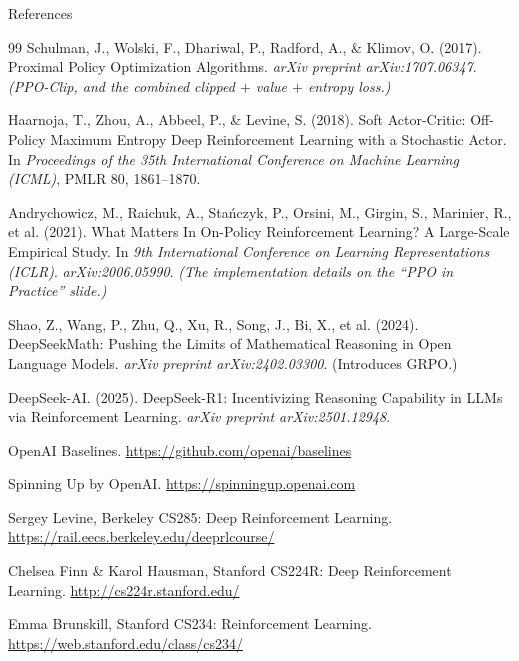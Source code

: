\begin{frame}[allowframebreaks]{References}
\begin{thebibliography}{99}
Schulman, J., Wolski, F., Dhariwal, P., Radford, A., \& Klimov, O. (2017).
\newblock Proximal Policy Optimization Algorithms.
\newblock \emph{arXiv preprint arXiv:1707.06347}.
\newblock \textit{(PPO-Clip, and the combined clipped $+$ value $+$ entropy loss.)}

Haarnoja, T., Zhou, A., Abbeel, P., \& Levine, S. (2018).
\newblock Soft Actor-Critic: Off-Policy Maximum Entropy Deep Reinforcement Learning with a Stochastic Actor.
\newblock In \emph{Proceedings of the 35th International Conference on Machine Learning (ICML)}, PMLR 80, 1861--1870.

Andrychowicz, M., Raichuk, A., Sta\'nczyk, P., Orsini, M., Girgin, S., Marinier, R., et al. (2021).
\newblock What Matters In On-Policy Reinforcement Learning? A Large-Scale Empirical Study.
\newblock In \emph{9th International Conference on Learning Representations (ICLR)}. \emph{arXiv:2006.05990}.
\newblock \textit{(The implementation details on the ``PPO in Practice'' slide.)}

Shao, Z., Wang, P., Zhu, Q., Xu, R., Song, J., Bi, X., et al. (2024).
\newblock DeepSeekMath: Pushing the Limits of Mathematical Reasoning in Open Language Models.
\newblock \emph{arXiv preprint arXiv:2402.03300}. (Introduces GRPO.)

DeepSeek-AI. (2025).
\newblock DeepSeek-R1: Incentivizing Reasoning Capability in LLMs via Reinforcement Learning.
\newblock \emph{arXiv preprint arXiv:2501.12948}.

OpenAI Baselines.
\newblock \url{https://github.com/openai/baselines}

Spinning Up by OpenAI.
\newblock \url{https://spinningup.openai.com}

Sergey Levine, Berkeley CS285: Deep Reinforcement Learning.
\newblock \url{https://rail.eecs.berkeley.edu/deeprlcourse/}

Chelsea Finn \& Karol Hausman, Stanford CS224R: Deep Reinforcement Learning.
\newblock \url{http://cs224r.stanford.edu/}

Emma Brunskill, Stanford CS234: Reinforcement Learning.
\newblock \url{https://web.stanford.edu/class/cs234/}

\end{thebibliography}
\end{frame}
